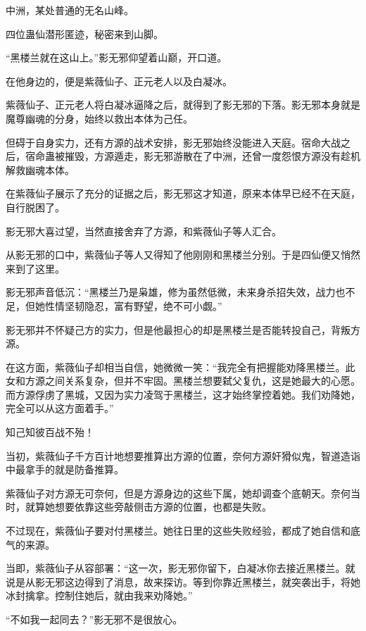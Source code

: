 
\begin{this_body}

中洲，某处普通的无名山峰。

四位蛊仙潜形匿迹，秘密来到山脚。

“黑楼兰就在这山上。”影无邪仰望着山巅，开口道。

在他身边的，便是紫薇仙子、正元老人以及白凝冰。

紫薇仙子、正元老人将白凝冰逼降之后，就得到了影无邪的下落。影无邪本身就是魔尊幽魂的分身，始终以救出本体为己任。

但碍于自身实力，还有方源的战术安排，影无邪始终没能进入天庭。宿命大战之后，宿命蛊被摧毁，方源遁走，影无邪游散在了中洲，还曾一度怨恨方源没有趁机解救幽魂本体。

在紫薇仙子展示了充分的证据之后，影无邪这才知道，原来本体早已经不在天庭，自行脱困了。

影无邪大喜过望，当然直接舍弃了方源，和紫薇仙子等人汇合。

从影无邪的口中，紫薇仙子等人又得知了他刚刚和黑楼兰分别。于是四仙便又悄然来到了这里。

影无邪声音低沉：“黑楼兰乃是枭雄，修为虽然低微，未来身杀招失效，战力也不足，但她性情坚韧隐忍，富有野望，绝不可小觑。”

影无邪并不怀疑己方的实力，但是他最担心的却是黑楼兰是否能转投自己，背叛方源。

在这方面，紫薇仙子却相当自信，她微微一笑：“我完全有把握能劝降黑楼兰。此女和方源之间关系复杂，但并不牢固。黑楼兰想要弑父复仇，这是她最大的心愿。而方源俘虏了黑城，又因为实力凌驾于黑楼兰，这才始终掌控着她。我们劝降她，完全可以从这方面着手。”

知己知彼百战不殆！

当初，紫薇仙子千方百计地想要推算出方源的位置，奈何方源奸猾似鬼，智道造诣中最拿手的就是防备推算。

紫薇仙子对方源无可奈何，但是方源身边的这些下属，她却调查个底朝天。奈何当时，就算她想要依靠这些旁敲侧击方源的位置，也都是失败。

不过现在，紫薇仙子要对付黑楼兰。她往日里的这些失败经验，都成了她自信和底气的来源。

当即，紫薇仙子从容部署：“这一次，影无邪你留下，白凝冰你去接近黑楼兰。就说是从影无邪这边得到了消息，故来探访。等到你靠近黑楼兰，就突袭出手，将她冰封擒拿。控制住她后，就由我来劝降她。”

“不如我一起同去？”影无邪不是很放心。


\end{this_body}
